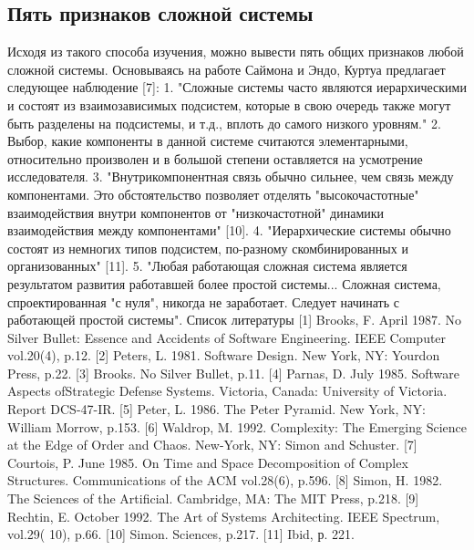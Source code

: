 \documentclass[10pt]{article}
\begin{document}
\subsection{Пять признаков сложной системы}
Исходя из такого способа изучения, можно вывести пять общих признаков любой сложной системы. Основываясь на работе Саймона и Эндо, Куртуа предлагает следующее наблюдение [7]: 
1. "Сложные системы часто являются иерархическими и состоят из взаимозависимых подсистем, которые в свою очередь также могут быть разделены на подсистемы, и т.д., вплоть до самого низкого уровням." 
2. Выбор, какие компоненты в данной системе считаются элементарными, относительно произволен и в большой степени оставляется на усмотрение исследователя. 
3. "Внутрикомпонентная связь обычно сильнее, чем связь между компонентами. Это обстоятельство позволяет отделять "высокочастотные" взаимодействия внутри компонентов от "низкочастотной" динамики взаимодействия между компонентами" [10]. 
4. "Иерархические системы обычно состоят из немногих типов подсистем, по-разному скомбинированных и организованных" [11]. 
5. "Любая работающая сложная система является результатом развития работавшей более простой системы... Сложная система, спроектированная "с нуля", никогда не заработает. Следует начинать с работающей простой системы". 
Список литературы
[1] Brooks, F. April 1987. No Silver Bullet: Essence and Accidents of Software Engineering. IEEE Computer vol.20(4), p.12. 
[2] Peters, L. 1981. Software Design. New York, NY: Yourdon Press, p.22. 
[3] Brooks. No Silver Bullet, p.11. 
[4] Parnas, D. July 1985. Software Aspects ofStrategic Defense Systems. Victoria, Canada: University of Victoria. Report DCS-47-IR. 
[5] Peter, L. 1986. The Peter Pyramid. New York, NY: William Morrow, p.153. 
[6] Waldrop, M. 1992. Complexity: The Emerging Science at the Edge of Order and Chaos. New-York, NY: Simon and Schuster. 
[7] Courtois, P. June 1985. On Time and Space Decomposition of Complex Structures. Communications of the ACM vol.28(6), p.596. 
[8] Simon, H. 1982. The Sciences of the Artificial. Cambridge, MA: The MIT Press, p.218. 
[9] Rechtin, E. October 1992. The Art of Systems Architecting. IEEE Spectrum, vol.29( 10), p.66. 
[10] Simon. Sciences, p.217. 
[11] Ibid, р. 221. 
\end{document}

